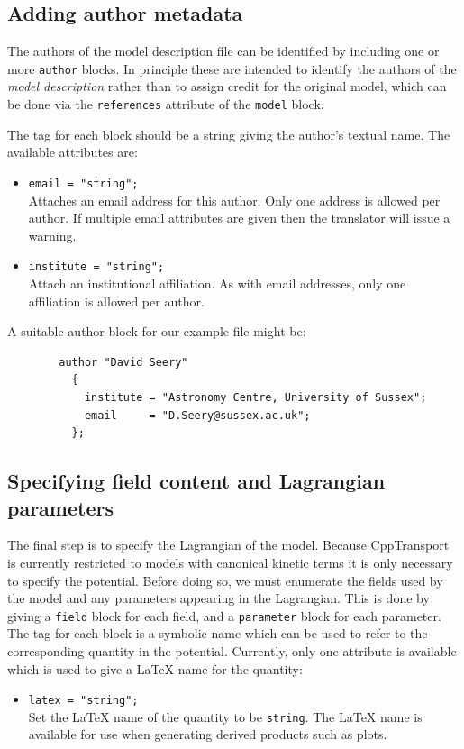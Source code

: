 \documentclass[11pt,a4paper]{article}
\newenvironment{example}{\begin{tcolorbox}[enhanced,breakable,colback=black!10,colbacktitle=black!20,colframe=black!40,coltitle=black,title=Example,fonttitle=\sffamily\fontseries{b}\selectfont]}{\end{tcolorbox}}
\newcommand{\packagefont}{\sffamily}
\newcommand{\CppTransport}{{\packagefont CppTransport}}
\newcommand{\block}[1]{\texttt{#1}}
\newcommand{\attribute}[1]{\texttt{#1}}
\begin{document}
\subsection{Adding author metadata}
\label{sec:author-block}
The authors of the model description file can be
identified by including one or more \block{author}
blocks.
In principle these are intended to identify the authors
of the \emph{model description} rather than to assign
credit for the original model,
which can be done via the
\attribute{references} attribute
of the \block{model} block.

The tag for each block should be a string giving the
author's textual name.
The available attributes are:
\begin{itemize}
    \item \attribute{email = "string";} \\
    Attaches an email address for this author. Only one
    address is allowed per author.
    If multiple email attributes are given then the
    translator will issue a warning.
    
    \item \attribute{institute = "string";} \\
    Attach an institutional affiliation.
    As with email addresses, only one affiliation
    is allowed per author.
\end{itemize}

\begin{example}
    A suitable author block for our example file might be:
    \begin{verbatim}
        author "David Seery"
          {
            institute = "Astronomy Centre, University of Sussex";
            email     = "D.Seery@sussex.ac.uk";
          };    
    \end{verbatim}
\end{example}

\subsection{Specifying field content and Lagrangian parameters}
\label{eq:field-param-block}
The final step is to specify the Lagrangian of the model.
Because {\CppTransport} is currently restricted to models with
canonical kinetic terms it is only necessary to specify the potential.
Before doing so, we must enumerate the fields used by the model
and any parameters appearing in the Lagrangian.
This is done by giving
a \block{field} block for each field, and a \block{parameter} block
for each parameter.
The tag for each block is a symbolic name which can be used to refer
to the corresponding quantity in the potential.
Currently, only one attribute is available which is used to give
a {\LaTeX} name for the quantity:
\begin{itemize}
    \item \attribute{latex = "string";} \\
    Set the {\LaTeX} name of the quantity to be
    \attribute{string}.
    The {\LaTeX} name is available for use when generating derived
    products such as plots.    
\end{itemize}
\end{document}
